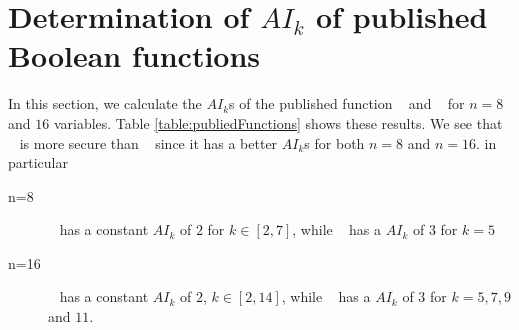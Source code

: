 \documentclass[11pt]{llncs}
\begin{document}
\newpage

\section{Determination of \texorpdfstring{$AI_k$}{AIk} of published Boolean functions}
In this section, we calculate the $AI_k$s of the published function ~\cite{Mat:ZJZQ23} and ~\cite{AMC:DalMal23} for $n=8$ and $16$ variables. Table \ref{table:publiedFunctions} shows these results.%
We see that ~\cite{AMC:DalMal23} is more secure than ~\cite{Mat:ZJZQ23} since it has a better $AI_k$s for both $n=8$ and $n=16$. in particular
\begin{description}
    \item[n=8] ~\cite{Mat:ZJZQ23} has a constant $AI_k$ of $2$ for $k\in [2,7]$, while ~\cite{AMC:DalMal23} has a $AI_k$ of $3$ for $k=5$
    \item[n=16] ~\cite{Mat:ZJZQ23} has a constant $AI_k$ of $2$, $k\in [2,14]$, while ~\cite{AMC:DalMal23} has a $AI_k$ of $3$ for $k=5,7,9$ and $11$.
\end{description}

\begin{table}[ht]
\caption{$AI_k$ of ~\cite{AMC:DalMal23} and ~\cite{Mat:ZJZQ23} with $m=3 \Rightarrow n=8$ and $m=4 \Rightarrow n=16$}\label{table:publiedFunctions}
\end{table}
\end{document}
